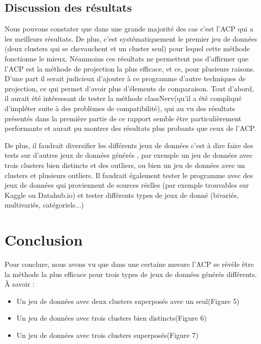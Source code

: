 \subsection{Discussion des résultats}
Nous pouvons constater que dans une grande majorité des cas c'est l'ACP qui a les meilleurs résultats. De plus, c'est systématiquement le premier jeu de données
(deux clusters qui se chevauchent et un cluster seul) pour lequel cette méthode fonctionne le mieux.
Néanmoins ces résultats ne permettent pas d'affirmer que l'ACP est la méthode de projection la plus efficace, et ce, pour plusieurs raisons.
D'une part il serait judicieux d'ajouter à ce programme d'autre techniques de projection, ce qui permet d'avoir plus d'élements de comparaison.
Tout d'abord, il aurait été intéressant de tester la méthode classNerv(qu'il a été compliqué d'impléter suite à des problèmes de compatibilité), qui au vu des résultats présentés dans la première partie de ce rapport
semble être particulièrement performante et aurait pu montrer des résultats plus probants que ceux de l'ACP. 

De plus, il faudrait diversifier les différents jeux de données c'est à dire faire des tests sur d'autres jeux de données générés , par exemple
un jeu de données avec trois clusters bien distincts et des outliers, ou bien un jeu de données avec un clusters et plusieurs outliers.
Il faudrait également tester le programme avec des jeux de données qui proviennent de sources réelles (par exemple trouvables sur Kaggle ou Datahub.io) et tester différents types
de jeux de donné (bivariés, multivariés, catégoriels...)


\section{Conclusion}
Pour conclure, nous avons vu que dans une certaine mesure l'ACP se révèle être la méthode la plus efficace pour trois types de jeux de données générés différents. À savoir :
\begin{itemize}
    \item Un jeu de données avec deux clusters superposés avec un seul(Figure 5)
    \item Un jeu de données avec trois clusters bien distincts(Figure 6)
    \item Un jeu de données avec trois clusters superposés(Figure 7)
\end{itemize}

